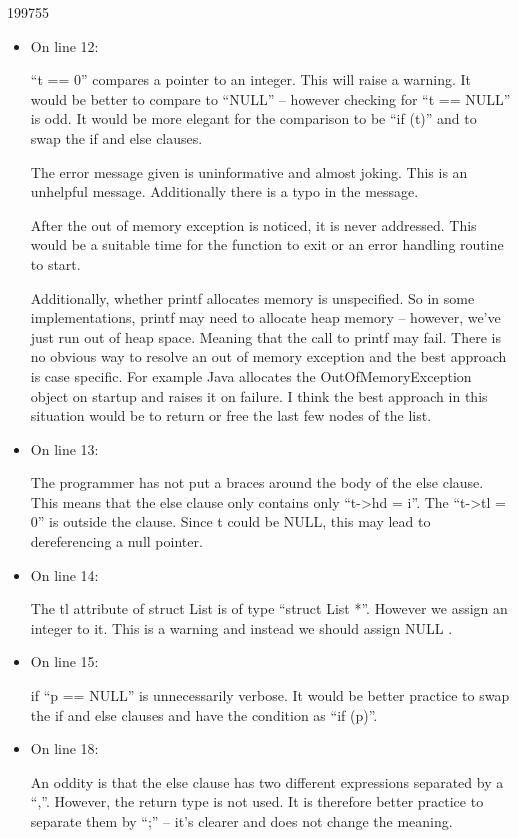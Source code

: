 \documentclass[10pt,\jkfside,a4paper]{article}
\begin{document}
\begin{examquestion}{1997}{5}{5}
\begin{itemize}
\item On line 12:

``t == 0'' compares a pointer to an integer. This will raise a warning. It
would be better to compare to ``NULL'' -- however checking for ``t == NULL''
is odd. It would be more elegant for the comparison to be ``if (t)'' and to
swap the if and else clauses.

The error message given is uninformative and almost joking. This is an
unhelpful message. Additionally there is a typo in the message.

After the out of memory exception is noticed, it is never addressed. This
would be a suitable time for the function to exit or an error handling
routine to start.

Additionally, whether printf allocates memory is unspecified. So in some
implementations, printf may need to allocate heap memory -- however, we've
just run out of heap space. Meaning that the call to printf may fail. There
is no obvious way to resolve an out of memory exception and the best
approach is case specific. For example Java allocates the OutOfMemoryException
object on startup and raises it on failure. I think the best approach in
this situation would be to return or free the last few nodes of the list.

\item On line 13:

The programmer has not put a braces around the body of the else clause.
This means that the else clause only contains only ``t->hd = i''. The
``t->tl = 0'' is outside the clause. Since t could be NULL, this may lead to
dereferencing a null pointer.

\item On line 14:

The tl attribute of struct List is of type ``struct List *''. However
we assign an integer to it. This is a warning and instead we should assign
NULL .

\item On line 15:

if ``p == NULL'' is unnecessarily verbose. It would be better practice
to swap the if and else clauses and have the condition as ``if (p)''.

\item On line 18:

An oddity is that the  else clause has two different expressions separated
by a ``,''. However, the return type is not used. It is therefore better
practice to separate them by ``;'' -- it's clearer and does not change the
meaning.


\end{itemize}
\end{examquestion}
\end{document}
